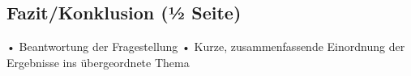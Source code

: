 \documentclass[man]{apa7}
\begin{document}
\subsection{Fazit/Konklusion (1⁄2 Seite)}
• Beantwortung der Fragestellung
• Kurze, zusammenfassende Einordnung der Ergebnisse ins übergeordnete Thema

\printbibliography

\appendix
\end{document}
